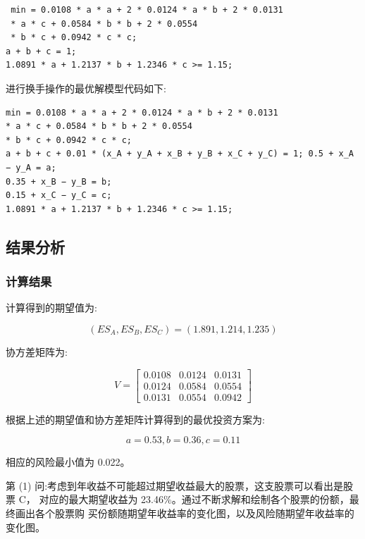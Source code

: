 \documentclass{article}
\begin{document}
\begin{lstlisting}
 min = 0.0108 * a * a + 2 * 0.0124 * a * b + 2 * 0.0131 
 * a * c + 0.0584 * b * b + 2 * 0.0554 
 * b * c + 0.0942 * c * c;
a + b + c = 1;
1.0891 * a + 1.2137 * b + 1.2346 * c >= 1.15;
\end{lstlisting}


进行换手操作的最优解模型代码如下:
\begin{lstlisting}
min = 0.0108 * a * a + 2 * 0.0124 * a * b + 2 * 0.0131 
* a * c + 0.0584 * b * b + 2 * 0.0554 
* b * c + 0.0942 * c * c;
a + b + c + 0.01 * (x_A + y_A + x_B + y_B + x_C + y_C) = 1; 0.5 + x_A − y_A = a;
0.35 + x_B − y_B = b;
0.15 + x_C − y_C = c;
1.0891 * a + 1.2137 * b + 1.2346 * c >= 1.15;
\end{lstlisting}


\subsection{结果分析}

\subsubsection{计算结果}

计算得到的期望值为:

$$(ES_A,ES_B,ES_C)=(1.891,1.214,1.235)$$

协方差矩阵为:

$$V=
 \begin{bmatrix}
   0.0108 & 0.0124 & 0.0131 \\
   0.0124 & 0.0584 & 0.0554 \\
   0.0131 & 0.0554 & 0.0942
  \end{bmatrix}
$$

根据上述的期望值和协方差矩阵计算得到的最优投资方案为:

$$a=0.53,b=0.36,c=0.11$$

相应的风险最小值为 0.022。


第 (1) 问:考虑到年收益不可能超过期望收益最大的股票，这支股票可以看出是股票 C， 对应的最大期望收益为 23.46\%。通过不断求解和绘制各个股票的份额，最终画出各个股票购 买份额随期望年收益率的变化图，以及风险随期望年收益率的变化图。
\end{document}

